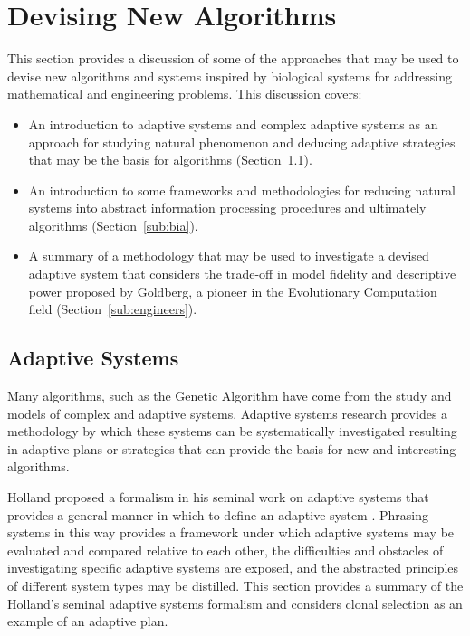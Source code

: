 
\section{Devising New Algorithms} 
\label{advanced:sec:new_algorithms}

This section provides a discussion of some of the approaches that may be used to devise new algorithms and systems inspired by biological systems for addressing mathematical and engineering problems.
This discussion covers:

\begin{itemize}
	\item An introduction to adaptive systems and complex adaptive systems as an approach for studying natural phenomenon and deducing adaptive strategies that may be the basis for algorithms (Section~\ref{sub:adaptive}).
	\item An introduction to some frameworks and methodologies for reducing natural systems into abstract information processing procedures and ultimately algorithms (Section~\ref{sub:bia}).
	\item A summary of a methodology that may be used to investigate a devised adaptive system that considers the trade-off in model fidelity and descriptive power proposed by Goldberg, a pioneer in the Evolutionary Computation field (Section~\ref{sub:engineers}).
\end{itemize}


% 
% 
\subsection{Adaptive Systems}
\label{sub:adaptive}
Many algorithms, such as the Genetic Algorithm have come from the study and models of complex and adaptive systems. Adaptive systems research provides a methodology by which these systems can be systematically investigated resulting in adaptive plans or strategies that can provide the basis for new and interesting algorithms. 

Holland proposed a formalism in his seminal work on adaptive systems that provides a general manner in which to define an adaptive system \cite{Holland1975}. Phrasing systems in this way provides a framework under which adaptive systems may be evaluated and compared relative to each other, the difficulties and obstacles of investigating specific adaptive systems are exposed, and the abstracted principles of different system types may be distilled. This section provides a summary of the Holland's seminal adaptive systems formalism and considers clonal selection as an example of an adaptive plan.

